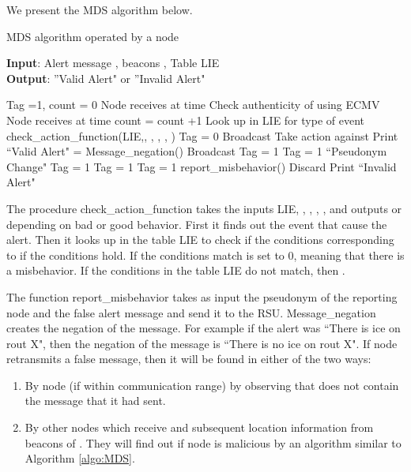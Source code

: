 \documentclass[conference]{IEEEtran}[10pt]
\begin{document}
We present the MDS algorithm below. 

\begin{algorithm}
\caption{MDS algorithm operated by a node  }
\label{algo:MDS}
\textbf{Input}: Alert message , beacons , Table LIE\\
\textbf{Output}: ''Valid Alert" or ''Invalid Alert"
\begin{algorithmic}[1]
\STATE Tag =1, count = 0 
\STATE  Node  receives   at time 
\STATE Check authenticity of  using ECMV
\WHILE{}
\STATE  Node  receives   at time 
\STATE  count = count +1
\STATE Look up in LIE for type  of event 
\STATE  check\_action\_function(LIE,, , , , )
\STATE Tag = 0
\IF{}
\STATE Broadcast 
\STATE Take action against 
\STATE Print ``Valid Alert"
\ELSE 
\STATE  = Message\_negation() 
\STATE Broadcast 
\STATE Tag = 1
\ENDIF
\ELSE 
\STATE Tag = 1
\ENDIF
\ENDWHILE
\ENDWHILE
{}
\STATE ``Pseudonym Change"
\STATE Tag = 1
\ENDIF
\ELSE 
\STATE Tag = 1
\ENDIF
\ELSE 
\STATE Tag = 1
\ENDIF
{}
\STATE report\_misbehavior() 
\STATE Discard 
\STATE Print ``Invalid Alert"
\ENDIF
\end{algorithmic}
\end{algorithm}

The procedure check\_action\_function takes the inputs LIE, , , , ,  and outputs
 or  depending on bad or good behavior. 
First it finds out the event  that cause the alert. 
Then it looks up in the table LIE to check if the conditions corresponding to  if the conditions hold. 
If the conditions match  is set to 0, meaning that there is a misbehavior. 
If the conditions in the table LIE do not match, then . 

The function report\_misbehavior takes as input the pseudonym of the reporting node and the false alert message and send it to the RSU. 
Message\_negation creates the negation of the message. 
For example if the alert was ``There is ice on rout X", then the negation of the message is 
``There is no ice on rout X". 
If node  retransmits a false message, then it will be found in either of the two ways: 
\begin{enumerate}
\item By node  (if within communication range) by
observing that  does not contain the message  that it had sent. 
\item By other nodes which receive  and subsequent location information from beacons of .
They will find out if node  is malicious by an algorithm similar to Algorithm \ref{algo:MDS}. 
\end{enumerate}
\end{document}
